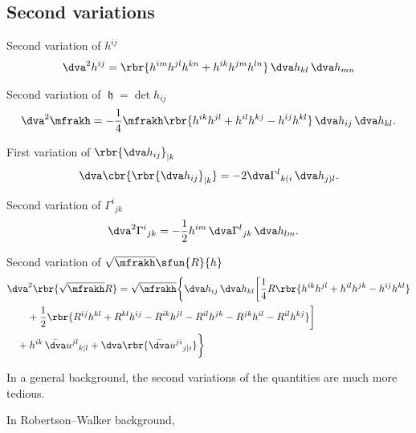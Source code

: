 \documentclass[a4paper,11pt]{article}
\begin{document}
\subsection*{Second variations}

Second variation of $h^{ij}$
\begin{align}
\dva^2 h^{ij} = \rbr{h^{im}h^{jl}h^{kn}+h^{ik}h^{jm}h^{ln}}
\,\dva h_{kl}\,\dva h_{mn}
\end{align}

Second variation of $\mfrakh = \det h_{ij}$
\begin{align}
\dva^2 \mfrakh = -\frac{1}{4} \mfrakh \rbr{
h^{ik}h^{jl}+h^{il}h^{kj}-h^{ij}h^{kl}}\,\dva h_{ij}\,\dva h_{kl}.
\end{align}

First variation of $\rbr{\dva h_{ij}}_{|k}$
\begin{align}
\dva\cbr{\rbr{\dva h_{ij}}_{|k}} = -2 \dva\Gamma^l{}_{k(i}\,\dva h_{j)l}.
\end{align}

Second variation of $\Gamma^i{}_{jk}$
\begin{align}
\dva^2 \Gamma^i{}_{jk} &=
-\frac{1}{2} h^{im} \,\dva\Gamma^{l}{}_{jk} \,\dva h_{lm}.
\end{align}

Second variation of $\sqrt{\mfrakh}\sfun{R}{h}$
\begin{align}
&
\dva^2\rbr{\sqrt{\mfrakh}R} = \sqrt{\mfrakh} \bigg\{
\dva h_{ij}\,\dva h_{kl}\bigg[
\frac{1}{4}R\rbr{h^{ik}h^{jl}+h^{il}h^{jk}-h^{ij}h^{kl}}
\nonumber \\
&\qquad
+\frac{1}{2}\rbr{
R^{ij}h^{kl}+R^{kl}h^{ij}-R^{ik}h^{jl}-R^{il}h^{jk}-R^{jk}h^{il}-R^{il}h^{kj}}
\bigg]
\nonumber \\
&\quad
+h^{ik}\,\bar{\dva}u^{jl}{}_{k|l}+\dva\rbr{\bar{\dva}u^{ji}{}_{j|i}} \bigg\}
\end{align}




In a general background, the second variations of the quantities  are much more 
tedious.

In Robertson--Walker background, 


\printbibliography
\end{document}
